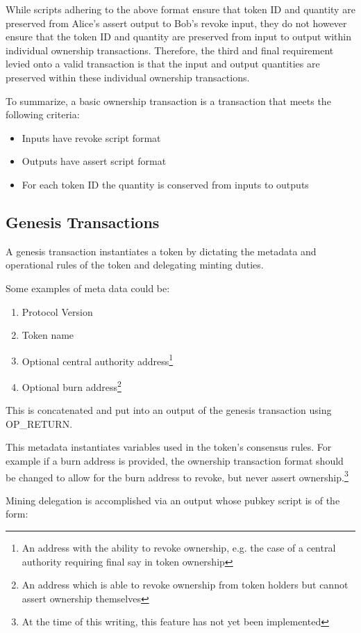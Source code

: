 \documentclass[9pt,oneside]{amsart}
\begin{document}
\begin{multicols}{2}
While scripts adhering to the above format ensure that token ID and quantity are preserved from Alice's assert output to Bob's revoke input, they do not however ensure that the token ID and quantity are preserved from input to output within individual ownership transactions. Therefore, the third and final requirement levied onto a valid transaction is that the input and output quantities are preserved within these individual ownership transactions.

To summarize, a basic ownership transaction is a transaction that meets the following criteria:
\begin{itemize}
    \item Inputs have revoke script format
    \item Outputs have assert script format
    \item For each token ID the quantity is conserved from inputs to outputs
\end{itemize}

\subsection{Genesis Transactions}\label{subsec:gentrans}
A genesis transaction instantiates a token by dictating the metadata and operational rules of the token and delegating minting duties.

Some examples of meta data could be:
\begin{enumerate}
	\item Protocol Version
    \item Token name
	\item Optional central authority address\footnote{An address with the ability to revoke ownership, e.g. the case of a central authority requiring final say in token ownership}
    \item Optional burn address\footnote{An address which is able to revoke ownership from token holders but cannot assert ownership themselves}
\end{enumerate}
This is concatenated and put into an output of the genesis transaction using OP\_RETURN.

This metadata instantiates variables used in the token's consensus rules. For example if a burn address is provided, the ownership transaction format should be changed to allow for the burn address to revoke, but never assert ownership.\footnote{At the time of this writing, this feature has not yet been implemented}

Mining delegation is accomplished via an output whose pubkey script is of the form:


\end{multicols}
\end{document}
